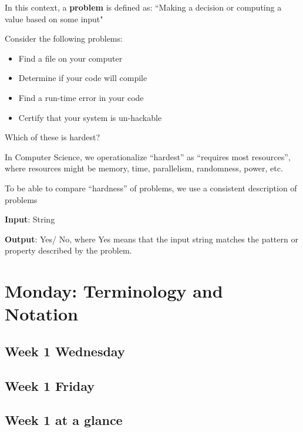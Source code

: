 In this context, a {\bf problem} is defined as: ``Making a decision or computing a value based on some input"

Consider the following problems: 
\begin{itemize}
   \item Find a file on your computer
   \item Determine if your code will compile
   \item Find a run-time error in your code
   \item Certify that your system is un-hackable
\end{itemize}

Which of these is hardest?

\vfill

In Computer Science, we operationalize ``hardest'' as ``requires most resources'', where
resources might be memory, time, parallelism, randomness, power, etc.

To be able to compare ``hardness'' of problems, we use a consistent description of problems

{\bf Input}: String

{\bf Output}: Yes/ No, where Yes means that the input string matches the pattern or property described by the problem.


\newpage
\section*{Monday: Terminology and Notation}


    
\newpage

\subsection*{Week 1 Wednesday}




\newpage
\subsection*{Week 1 Friday}




\newpage
\subsection*{Week 1 at a glance}

